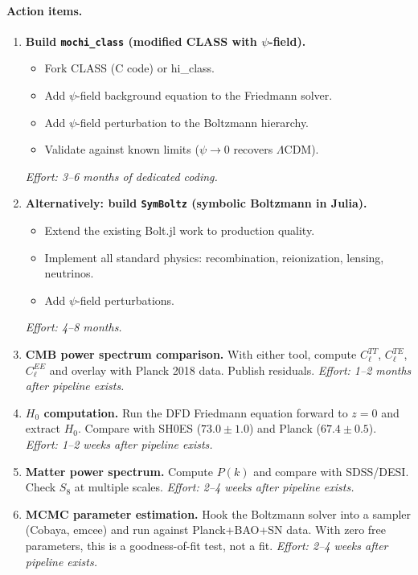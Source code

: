 \documentclass[11pt,a4paper]{article}
\begin{document}
\paragraph{Action items.}
\begin{enumerate}
    \item \textbf{Build \texttt{mochi\_class} (modified CLASS with $\psi$-field).}
    \begin{itemize}
        \item Fork CLASS (C code) or hi\_class.
        \item Add $\psi$-field background equation to the Friedmann solver.
        \item Add $\psi$-field perturbation to the Boltzmann hierarchy.
        \item Validate against known limits ($\psi \to 0$ recovers $\Lambda$CDM).
    \end{itemize}
    \emph{Effort: 3--6 months of dedicated coding.}
    \item \textbf{Alternatively: build \texttt{SymBoltz} (symbolic Boltzmann in Julia).}
    \begin{itemize}
        \item Extend the existing Bolt.jl work to production quality.
        \item Implement all standard physics: recombination, reionization, lensing, neutrinos.
        \item Add $\psi$-field perturbations.
    \end{itemize}
    \emph{Effort: 4--8 months.}
    \item \textbf{CMB power spectrum comparison.} With either tool, compute $C_\ell^{TT}$, $C_\ell^{TE}$, $C_\ell^{EE}$ and overlay with Planck 2018 data. Publish residuals. \emph{Effort: 1--2 months after pipeline exists.}
    \item \textbf{$H_0$ computation.} Run the DFD Friedmann equation forward to $z=0$ and extract $H_0$. Compare with SH0ES ($73.0 \pm 1.0$) and Planck ($67.4 \pm 0.5$). \emph{Effort: 1--2 weeks after pipeline exists.}
    \item \textbf{Matter power spectrum.} Compute $P(k)$ and compare with SDSS/DESI. Check $S_8$ at multiple scales. \emph{Effort: 2--4 weeks after pipeline exists.}
    \item \textbf{MCMC parameter estimation.} Hook the Boltzmann solver into a sampler (Cobaya, emcee) and run against Planck+BAO+SN data. With zero free parameters, this is a goodness-of-fit test, not a fit. \emph{Effort: 2--4 weeks after pipeline exists.}
\end{enumerate}
\end{document}
